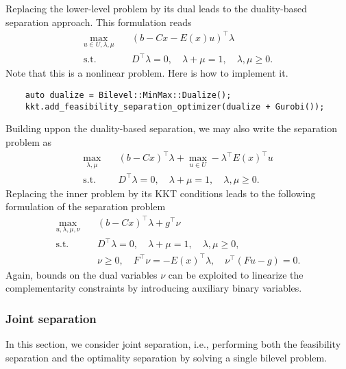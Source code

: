 
Replacing the lower-level problem by its dual leads to the duality-based
separation approach. This formulation reads 
\begin{align*}
    \max_{u\in U,\lambda,\mu} \quad & (b - Cx - E(x)u)^\top\lambda \\
    \text{s.t.} \quad
    & D^\top\lambda = 0, \quad \lambda + \mu = 1, \quad \lambda,\mu\ge 0.
\end{align*}
Note that this is a nonlinear problem. Here is how to implement it.
%
\begin{lstlisting}
    auto dualize = Bilevel::MinMax::Dualize();
    kkt.add_feasibility_separation_optimizer(dualize + Gurobi());
\end{lstlisting}



{
\color{red}
Building uppon the duality-based separation, we may also write the separation
problem as 
%
\begin{align*}
    \max_{\lambda,\mu} \quad & (b - Cx)^\top\lambda + \max_{u\in U} -\lambda^\top E(x)^\top u \\
    \text{s.t.} \quad & D^\top\lambda = 0, \quad \lambda + \mu = 1, \quad \lambda,\mu\ge 0.
\end{align*}
Replacing the inner problem by its KKT conditions leads to the following
formulation of the separation problem
\begin{align*}
    \max_{u,\lambda,\mu,\nu} \quad & (b - Cx)^\top\lambda + g^\top\nu \\
    \text{s.t.} \quad & D^\top\lambda = 0, \quad \lambda + \mu = 1, \quad \lambda,\mu\ge 0, \\
    & \nu \ge 0, \quad F^\top\nu = -E(x)^\top\lambda, \quad \nu^\top(Fu - g) = 0.
\end{align*}
Again, bounds on the dual variables $\nu$ can be exploited to linearize the
complementarity constraints by introducing auxiliary binary variables.
}

\subsubsection{Joint separation}

In this section, we consider joint separation, i.e., performing both the
feasibility separation and the optimality separation by solving a single
bilevel problem.


